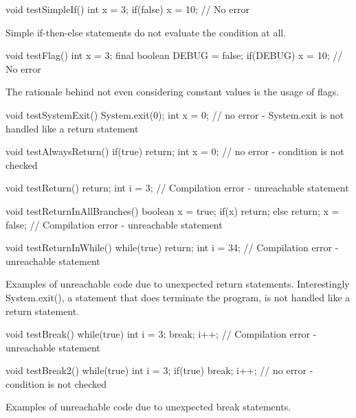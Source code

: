 \begin{program}[h!]
	\begin{JavaCode}
void testSimpleIf() {
	int x = 3;
	if(false) x = 10; // No error
}\end{JavaCode}
	\caption{Simple if-then-else statements do not evaluate the condition at all.}
	\label{code:Java infeasible undetected}
\end{program}

\begin{program}[h!]
	\begin{JavaCode}
void testFlag() {
	int x = 3;
	final boolean DEBUG = false;
	if(DEBUG) x = 10; // No error
}\end{JavaCode}
	\caption{The rationale behind not even considering constant values is the usage of flags.}
	\label{code:Java flags}
\end{program}

\begin{program}[h!]
	\begin{JavaCode}
void testSystemExit() {
	System.exit(0);
	int x = 0; // no error - System.exit is not handled like a return statement
}

void testAlwaysReturn() {
	if(true) return;
	int x = 0; // no error - condition is not checked
}

void testReturn() {
	return;
	int i = 3; // Compilation error - unreachable statement
}

void testReturnInAllBranches() {
	boolean x = true;
	if(x) return;
	else return;
	x = false; // Compilation error - unreachable statement
}

void testReturnInWhile() {
	while(true) {
		return;
	}
	int i = 34; // Compilation error - unreachable statement
}\end{JavaCode}
	\caption{Examples of unreachable code due to unexpected return statements. Interestingly System.exit(), a statement that does terminate the program, is not handled like a return statement.}
	\label{code:Java unexpected return}
\end{program}

\begin{program}[h!]
	\begin{JavaCode}
void testBreak() {
	while(true) {
		int i = 3;
		break; 
		i++; // Compilation error - unreachable statement
	}
}

void testBreak2() {
	while(true) {
		int i = 3;
		if(true) break; 
		i++; // no error - condition is not checked
	}
}\end{JavaCode}
	\caption{Examples of unreachable code due to unexpected break statements.}
	\label{code:Java unexpected break}
\end{program}


